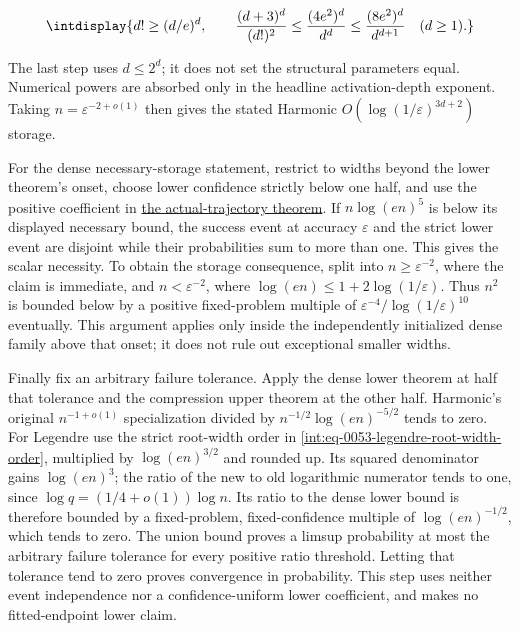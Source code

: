 \begingroup\renewcommand{\theHequation}{intdisplay.827}
\begin{equation}
\intdisplay{
d!\ge(d/e)^d,\qquad
\frac{(d+3)^d}{(d!)^2}
\le \frac{(4e^2)^d}{d^d}
\le\frac{(8e^2)^d}{d^{d+1}}\quad(d\ge1).
}
\label{int:eq-0404-corollary-factorial-elimination}
\end{equation}
\endgroup


The last step uses \(d\le2^d\); it does not set the structural parameters equal. Numerical powers are absorbed only in the headline activation-depth exponent. Taking \(n=\varepsilon^{-2+o(1)}\) then gives the stated Harmonic \(O(\log(1/\varepsilon)^{3d+2})\) storage.



For the dense necessary-storage statement, restrict to widths beyond the lower theorem's onset, choose lower confidence strictly below one half, and use the positive coefficient in \hyperref[int:dense-trajectory-lower]{the actual-trajectory theorem}. If \(n\log(en)^5\) is below its displayed necessary bound, the success event at accuracy \(\varepsilon\) and the strict lower event are disjoint while their probabilities sum to more than one. This gives the scalar necessity. To obtain the storage consequence, split into \(n\ge\varepsilon^{-2}\), where the claim is immediate, and \(n<\varepsilon^{-2}\), where \(\log(en)\le1+2\log(1/\varepsilon)\). Thus \(n^2\) is bounded below by a positive fixed-problem multiple of \(\varepsilon^{-4}/\log(1/\varepsilon)^{10}\) eventually. This argument applies only inside the independently initialized dense family above that onset; it does not rule out exceptional smaller widths.



Finally fix an arbitrary failure tolerance. Apply the dense lower theorem at half that tolerance and the compression upper theorem at the other half. Harmonic's original \(n^{-1+o(1)}\) specialization divided by \(n^{-1/2}\log(en)^{-5/2}\) tends to zero. For Legendre use the strict root-width order in \eqref{int:eq-0053-legendre-root-width-order}, multiplied by \(\log(en)^{3/2}\) and rounded up. Its squared denominator gains \(\log(en)^3\); the ratio of the new to old logarithmic numerator tends to one, since \(\log q=(1/4+o(1))\log n\). Its ratio to the dense lower bound is therefore bounded by a fixed-problem, fixed-confidence multiple of \(\log(en)^{-1/2}\), which tends to zero. The union bound proves a limsup probability at most the arbitrary failure tolerance for every positive ratio threshold. Letting that tolerance tend to zero proves convergence in probability. This step uses neither event independence nor a confidence-uniform lower coefficient, and makes no fitted-endpoint lower claim.


